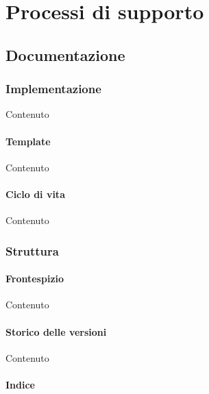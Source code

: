 
\section{Processi di supporto}\label{PS}	

	\subsection{Documentazione}\label{PS:Documentazione}
	
		
		\subsubsection{Implementazione}\label{PS:Documentazione:Implementazione}
		Contenuto
			
			\paragraph{Template}\label{PS:Documentazione:Implementazione:Template}
			Contenuto
				
			\paragraph{Ciclo di vita}\label{PS:Documentazione:Implementazione:CicloVita}
			Contenuto
	
		\subsubsection{Struttura}\label{PS:Documentazione:Struttura}
		
			\paragraph{Frontespizio}\label{PS:Documentazione:Struttura:Frontespizio}
			Contenuto
			
			\paragraph{Storico delle versioni}\label{PS:Documentazione:Struttura:StoricoVersioni}	
			Contenuto
			
			\paragraph{Indice}\label{PS:Documentazione:Struttura:Indice}
			
